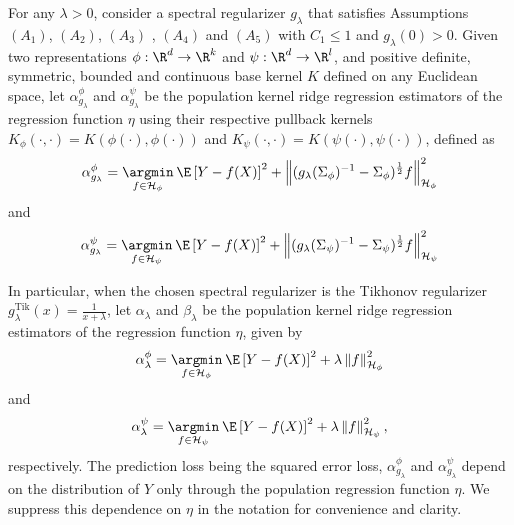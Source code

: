 \documentclass{article} %
\newcommand{\repone}{\phi}
\newcommand{\reptwo}{\psi}
\newcommand{\Hone}{\mathcal{H}_{\phi}}
\newcommand{\Htwo}{\mathcal{H}_{\psi}}
\newcommand{\Sone}{\Sigma_{\repone}}
\newcommand{\Stwo}{\Sigma_{\reptwo}}
\newcommand{\gl}{g_{\lambda}}
\newcommand{\glTik}{\gl^{\operatorname{Tik}}}
\newcommand{\norm}[1]{\left\|#1\right\|}
\newcommand{\SpectralAssumptionone}{A_{1}}
\newcommand{\SpectralAssumptiontwo}{A_{2}}
\newcommand{\SpectralAssumptionthree}{A_{3}}
\newcommand{\SpectralAssumptionfour}{A_{4}}
\newcommand{\SpectralAssumptionfive}{A_{5}}
\theoremstyle{plain}
\begin{document}
 For any $\lambda>0$, consider a spectral regularizer $\gl$ that satisfies Assumptions \hyperref[Assumption Spectral Regularizer A1]{$(\SpectralAssumptionone)$}, \hyperref[Assumption Spectral Regularizer A2]{$(\SpectralAssumptiontwo)$}, \hyperref[Assumption Spectral Regularizer A3]{$(\SpectralAssumptionthree)$} , \hyperref[Assumption Spectral Regularizer A4]{$(\SpectralAssumptionfour)$} and \hyperref[Assumption Spectral Regularizer A5]{$(\SpectralAssumptionfive)$} with $C_1 \leq 1$ and $\gl(0)>0$. Given two representations $\repone: \R^d \to \R^k$ and $\reptwo: \R^d \to \R^l$, and positive definite, symmetric, bounded and continuous base kernel $K$ defined on any Euclidean space, let $\alpha_{\gl}^{\repone}$ and $\alpha_{\gl}^{\reptwo}$ be the population kernel ridge regression estimators of the regression function $\eta$ using their respective pullback kernels $K_{\repone}(\cdot,\cdot) = K(\repone(\cdot),\repone(\cdot))$ and $K_{\reptwo}(\cdot,\cdot) = K(\reptwo(\cdot),\reptwo(\cdot))$, defined as
 \begin{equation}\label{Definition of alpha general case repone}
    \alpha_{\gl}^{\repone} = \underset{f \in \Hone}{\argmin} \hspace{2pt} \E\left[Y-f(X)\right]^{2} + \norm{(\gl(\Sone)^{-1} - \Sone)^{\frac{1}{2}}f}_{\Hone}^{2}
\end{equation}
and
\begin{equation}\label{Definition of alpha general case reptwo}
    \alpha_{\gl}^{\reptwo} = \underset{f \in \Htwo}{\argmin} \hspace{2pt} \E\left[Y-f(X)\right]^{2} + \norm{(\gl(\Stwo)^{-1} - \Stwo)^{\frac{1}{2}}f}_{\Htwo}^{2}
\end{equation}

In particular, when the chosen spectral regularizer is the Tikhonov regularizer $\glTik(x) = \frac{1}{x+\lambda}$, let $\alpha_{\lambda}$ and $\beta_{\lambda}$ be the population kernel ridge regression estimators of the regression function $\eta$, given by
\begin{equation}\label{Definition of alpha Tikhonov repone}
    \alpha_{\lambda}^{\repone} = \underset{f \in \Hone}{\argmin} \hspace{2pt} \E\left[Y-f(X)\right]^{2} + \lambda \norm{f}_{\Hone}^{2}
\end{equation}
and
\begin{equation}\label{Definition of alpha Tikhonov reptwo}
\alpha_{\lambda}^{\reptwo} = \underset{f \in \Htwo}{\argmin} \hspace{2pt} \E\left[Y-f(X)\right]^{2} + \lambda \norm{f}_{\Htwo}^{2},
\end{equation}
respectively. The prediction loss being the squared error loss, $\alpha_{\gl}^{\repone}$ and $\alpha_{\gl}^{\reptwo}$ depend on the distribution of $Y$ only through the population regression function $\eta$. We suppress this dependence on $\eta$ in the notation for convenience and clarity.
\end{document}
